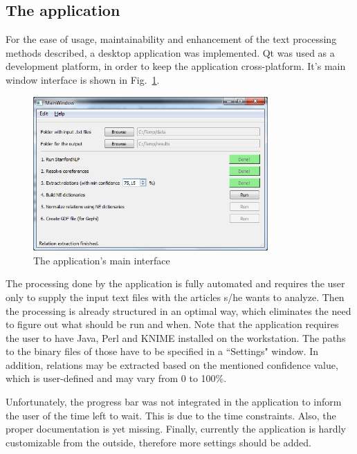 \documentclass[]{article}
\begin{document}
%
\subsection{The application}
%
For the ease of usage, maintainability and enhancement of the text processing methods described, a desktop application was implemented. Qt was used as a development platform, in order to keep the application cross-platform. It's main window interface is shown in Fig.~\ref{Application}.
\begin{figure}[htbp]
  \centering
    \includegraphics[width=0.8\textwidth]{images/Application}
    \caption{The application's main interface}
  \label{Application}
\end{figure}

The processing done by the application is fully automated and requires the user only to supply the input text files with the articles s/he wants to analyze. Then the processing is already structured in an optimal way, which eliminates the need to figure out what should be run and when. Note that the application requires the user to have Java, Perl and KNIME installed on the workstation. The paths to the binary files of those have to be specified in a ``Settings" window. In addition, relations may be extracted based on the mentioned confidence value, which is user-defined and may vary from 0 to 100\%.

Unfortunately, the progress bar was not integrated in the application to inform the user of the time left to wait. This is due to the time constraints. Also, the proper documentation is yet missing. Finally, currently the application is hardly customizable from the outside, therefore more settings should be added.

%
\end{document}

